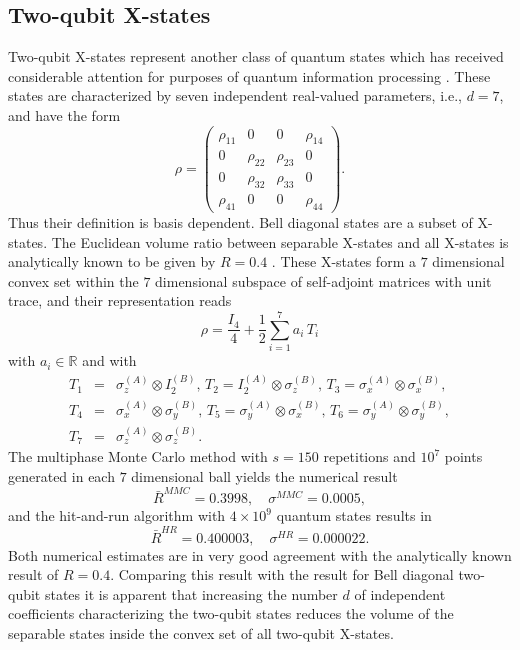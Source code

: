 \documentclass[12pt]{iopart}
\begin{document}
\subsection{Two-qubit X-states}\label{sec:xsta}

Two-qubit X-states represent another class of quantum states which has received considerable attention for purposes of quantum information processing \cite{Ravi09}. These states are characterized by 
seven independent real-valued parameters, i.e., $d=7$, and have the form
\begin{equation}
 \rho=\begin{pmatrix}
\rho_{11} & 0 & 0 & \rho_{14} \\
0 & \rho_{22} & \rho_{23} & 0 \\
0 & \rho_{32} & \rho_{33} & 0 \\
\rho_{41} & 0 & 0 & \rho_{44}
\end{pmatrix}. \nonumber
\end{equation}
Thus their definition is basis dependent.
Bell diagonal states are a subset of X-states. The Euclidean volume ratio between separable X-states and 
all X-states is analytically known to be given by $R=0.4$ \cite{Milz}. These X-states form a $7$ dimensional convex set within the $7$ dimensional subspace of self-adjoint matrices with unit 
trace, and their representation reads
\begin{equation}
\rho = \frac{I_4}{4} + \frac{1}{2}\sum_{i=1}^7 a_i\,T_i
\label{Xs}
\end{equation}
with $a_i\in \mathbb{R}$ and with
\begin{eqnarray}
T_1&=&\sigma^{(A)}_z\otimes I^{(B)}_2, \, T_2=I^{(A)}_2 \otimes \sigma^{(B)}_z, \, T_3=\sigma^{(A)}_x\otimes \sigma^{(B)}_x, \nonumber \\
T_4&=&\sigma^{(A)}_x\otimes \sigma^{(B)}_y, \, T_5=\sigma^{(A)}_y\otimes \sigma^{(B)}_x, \, T_6=\sigma^{(A)}_y \otimes \sigma^{(B)}_y, \nonumber \\
T_7&=&\sigma^{(A)}_z\otimes \sigma^{(B)}_z. \nonumber
\end{eqnarray}
The multiphase Monte Carlo method with $s=150$ repetitions and $10^7$ points generated in each $7$ dimensional ball yields the numerical result
\begin{equation}
 \bar{R}^{MMC}=0.3998, \quad \sigma^{MMC}=0.0005,
\end{equation}
and the hit-and-run algorithm with $4 \times 10^9$ quantum states results in
\begin{equation}
 \bar{R}^{HR}=0.400003, \quad \sigma^{HR}=0.000022. 
\end{equation}
Both numerical estimates are in very good agreement with the analytically known result of $R=0.4$.
Comparing this result with the result for Bell diagonal two-qubit states it is apparent that increasing the number $d$ of independent coefficients characterizing the two-qubit states
reduces the volume of the separable states inside the convex set of all two-qubit X-states. 
\end{document}
